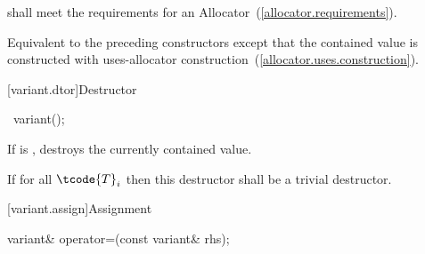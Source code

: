 \begin{itemdescr}
\pnum
\requires
{} shall meet the requirements for an Allocator~(\ref{allocator.requirements}).

\pnum
\effects
Equivalent to the preceding constructors except that the contained value is
constructed with uses-allocator construction~(\ref{allocator.uses.construction}).
\end{itemdescr}

[variant.dtor]{Destructor}

%
\begin{itemdecl}
~variant();
\end{itemdecl}

\begin{itemdescr}
\pnum
\effects
If  is ,
destroys the currently contained value.

\pnum
\remarks
If  for all $\tcode{T}_i$
then this destructor shall be a trivial destructor.
\end{itemdescr}

[variant.assign]{Assignment}

%
\begin{itemdecl}
variant& operator=(const variant& rhs);
\end{itemdecl}

